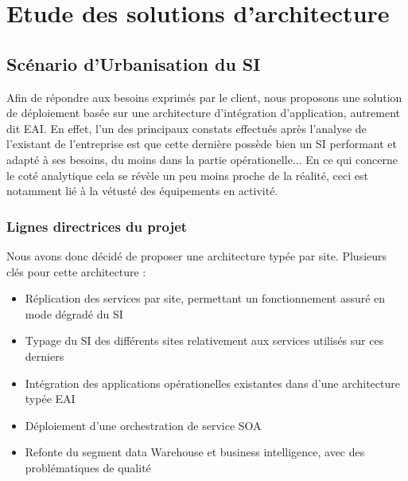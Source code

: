 \section{Etude des solutions d'architecture}

\subsection{Scénario d'Urbanisation du SI}

Afin de répondre aux besoins exprimés par le client, nous proposons une solution de déploiement basée sur une architecture d'intégration d'application, autrement dit EAI. 
En effet, l'un des principaux constats effectués après l'analyse de l'existant de l'entreprise est que cette dernière possède bien un SI performant et adapté à ses besoins, du moins dans la partie opérationelle... En ce qui concerne le coté analytique cela se révèle un peu moins proche de la réalité, ceci est notamment lié à la vétusté des équipements en activité.

\subsubsection{Lignes directrices du projet}

Nous avons donc décidé de proposer une architecture typée par site. Plusieurs clés pour cette architecture :\\

\begin{itemize}
\item Réplication des services par site, permettant un fonctionnement assuré en mode dégradé du SI
\item Typage du SI des différents sites relativement aux services utilisés sur ces derniers
\item Intégration des applications opérationelles existantes dans d'une architecture typée EAI
\item Déploiement d'une orchestration de service SOA
\item Refonte du segment data Warehouse et business intelligence, avec des problématiques de qualité\\
\end{itemize}

